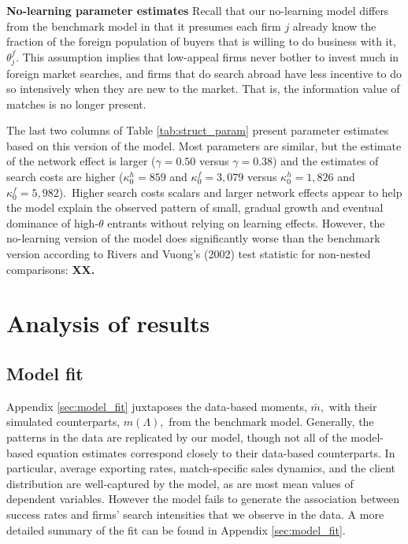 \documentclass[12pt]{article}
\begin{document}
\textbf{No-learning parameter estimates }Recall that our no-learning model
differs from the benchmark model in that it presumes each firm $j$ already
know the fraction of the foreign population of buyers that is willing to do
business with it, $\theta _{j}^{f}.$ This assumption implies that low-appeal
firms never bother to invest much in foreign market searches, and firms that
do search abroad have less incentive to do so intensively when they are new
to the market. That is, the information value of matches is no longer
present.

The last two columns of Table \ref{tab:struct_param} present parameter
estimates based on this version of the model. Most parameters are similar,
but the estimate of the network effect is larger ($\gamma =0.50$ versus $%
\gamma =0.38$) and the estimates of search costs are higher ($\kappa
_{0}^{h}=859$ and $\kappa _{0}^{f}=3,079$ versus $\kappa _{0}^{h}=1,826$ and 
$\kappa _{0}^{f}=5,982$).\ Higher search costs scalars and larger network
effects appear to help the model explain the observed pattern of small,
gradual growth and eventual dominance of high-$\theta $ entrants without
relying on learning effects. However, the no-learning version of the model
does significantly worse than the benchmark version according to Rivers and
Vuong's (2002) test statistic for non-nested comparisons: \textbf{XX.}

\section{Analysis of results}

\subsection{Model fit}

Appendix \ref{sec:model_fit} juxtaposes the data-based moments, $\bar{m},$
with their simulated counterparts, $m(\Lambda ),$ from the benchmark model.
Generally, the patterns in the data are replicated by our model, though not
all of the model-based equation estimates correspond closely to their
data-based counterparts. In particular, average exporting rates,
match-specific sales dynamics, and the client distribution are well-captured
by the model, as are most mean values of dependent variables. However the
model fails to generate the association between success rates and firms'
search intensities that we observe in the data. A more detailed summary of
the fit can be found in Appendix \ref{sec:model_fit}.
\end{document}
